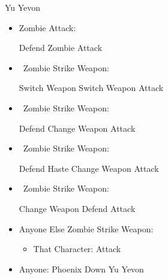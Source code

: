 \begin{battle}[99999]{Yu Yevon}
    \begin{itemize}
        \item Zombie Attack:
        \begin{itemize}
            \yunaf Defend
            \tidusf Zombie Attack
        \end{itemize}
        \item \yuna\ Zombie Strike Weapon:
        \begin{itemize}
            \yunaf Switch Weapon
            \tidusf Switch Weapon
            \yunaf Attack
        \end{itemize}
        \item \tidus\ Zombie Strike Weapon:
        \begin{itemize}
            \yunaf Defend
            \tidusf Change Weapon
            \tidusf Attack
        \end{itemize}
        \item \rikku\ Zombie Strike Weapon:
        \begin{itemize}
            \yunaf Defend
            \tidusf Haste \rikku
            \yunaf Change Weapon
            \rikkuf Attack
        \end{itemize}
        \item \auron\ Zombie Strike Weapon:
        \begin{itemize}
            \switch{\yuna}{\auron}
            \auronf Change Weapon
            \tidusf Defend
            \auronf Attack
        \end{itemize}
        \item Anyone Else Zombie Strike Weapon:
        \begin{itemize}
            \item That Character: Attack
        \end{itemize}
        \item Anyone: Phoenix Down Yu Yevon
    \end{itemize}
\end{battle}
\colstart
